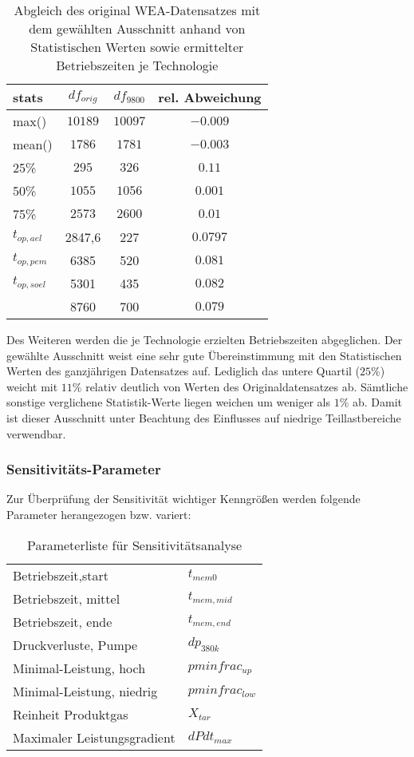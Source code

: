 \documentclass[onecolumn,10pt,titlepage]{article}
\begin{document}
\begin{table}[H]
	\caption{Abgleich des original WEA-Datensatzes mit dem gewählten Ausschnitt anhand von Statistischen Werten sowie ermittelter Betriebszeiten je Technologie}
	\begin{tabular}{l|ccc}
		
		stats& $df_{orig}$ & $df_{9800}$ &rel. Abweichung\\ 
		\hline 
		\hline
		max()			& $10189$ & $10097$& $-0.009$\\ 
		\hline 
		mean()			&$1786$  & $1781$ &$-0.003$\\ 
		\hline 
		25\%			&$295$  & $326$ & $0.11$\\ 
		\hline 
		50\%			& $1055$ & $1056$& $0.001$\\ 
		\hline 
		75\%			& $2573$ &  $2600$&$0.01$\\ 
		\hline 
		
		$t_{op,ael}$	& 2847,6 & 227& $0.0797$\\ 
		\hline 
		$t_{op,pem}$	& 6385 & 520& $0.081$\\
		\hline
		$t_{op,soel}$	& 5301 & 435& $0.082$\\
		\hline
		& 8760 & 700& $0.079$\\
	\end{tabular} 
	\label{tab:WEA_slice_stat_vgl}
\end{table}
Des Weiteren werden die je Technologie erzielten Betriebszeiten abgeglichen.
Der gewählte Ausschnitt weist eine sehr gute Übereinstimmung mit den Statistischen Werten des ganzjährigen Datensatzes auf. Lediglich das untere Quartil ($25\%$) weicht mit $11\%$ relativ deutlich von Werten des Originaldatensatzes ab. Sämtliche sonstige verglichene Statistik-Werte liegen weichen um weniger als $1\%$ ab. Damit ist dieser Ausschnitt unter Beachtung des Einflusses auf niedrige Teillastbereiche verwendbar.

\subsubsection{Sensitivitäts-Parameter}
Zur Überprüfung der Sensitivität wichtiger Kenngrößen werden folgende Parameter herangezogen bzw. variert:
\begin{table}[H]
	\caption{Parameterliste für Sensitivitätsanalyse}
	\begin{tabular}{ll}
		Betriebszeit,start	&$t_{mem0}$ \\
		Betriebszeit, mittel	&$t_{mem,mid}$\\
		Betriebszeit, ende 		&$t_{mem,end}$\\
		Druckverluste, Pumpe 	&$dp_{380k}$\\
		Minimal-Leistung, hoch 	&$pminfrac_{up}$\\
		Minimal-Leistung, niedrig &$pminfrac_{low}$\\
		Reinheit Produktgas &$X_{tar}$\\
		Maximaler Leistungsgradient &$dPdt_{max}$\\
	\end{tabular}
	\label{tab:sens_params}
\end{table}
\end{document}
